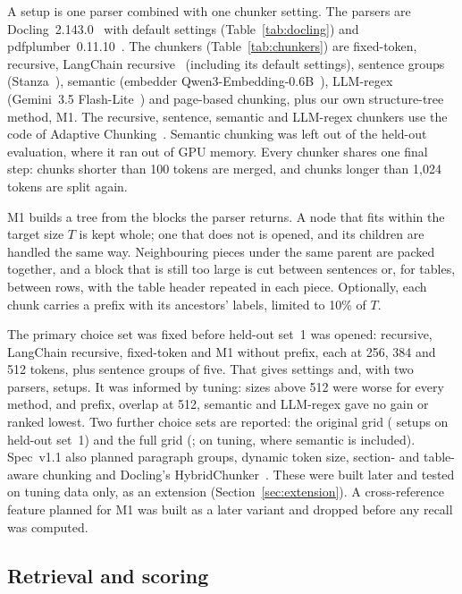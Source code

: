 A setup is one parser combined with one chunker setting. The parsers are
Docling~2.143.0~\cite{auer2024docling} with default settings (Table~\ref{tab:docling})
and pdfplumber~0.11.10~\cite{pdfplumber}. The chunkers (Table~\ref{tab:chunkers}) are
fixed-token, recursive, LangChain recursive~\cite{langchain} (including its default settings),
sentence groups (Stanza~\cite{stanza}), semantic (embedder Qwen3-Embedding-0.6B~\cite{qwen3embedding}), LLM-regex (Gemini~3.5 Flash-Lite~\cite{gemini}) and page-based
chunking, plus our own structure-tree method, M1. The recursive, sentence,
semantic and LLM-regex chunkers use the code of Adaptive
Chunking~\cite{demourajunior2026adaptive}. Semantic chunking was left out
of the held-out evaluation, where it ran out of GPU memory. Every chunker shares one final step: chunks shorter
than 100 tokens are merged, and chunks longer than 1,024 tokens are split
again.

M1 builds a tree from the blocks the parser returns. A node that fits within
the target size $T$ is kept whole; one that does not is opened, and its
children are handled the same way. Neighbouring pieces under the same parent
are packed together, and a block that is still too large is cut between
sentences or, for tables, between rows, with the table header repeated in
each piece. Optionally, each chunk carries a prefix with its ancestors'
labels, limited to 10\% of $T$.

The primary choice set was fixed before held-out set~1 was opened: recursive,
LangChain recursive, fixed-token and M1 without prefix, each at 256, 384 and
512 tokens, plus sentence groups of five. That gives \RQonePrimarySettings{} settings and, with two
parsers, \RQoneSetups{} setups. It was informed by tuning: sizes above 512 were
worse for every method, and prefix, overlap at 512, semantic and LLM-regex gave
no gain or ranked lowest. Two further choice sets are reported: the original
grid (\RQoneOriginalSetups{} setups on held-out set~1) and the full grid
(\HeldOutSetups{}; \TuningSetups{} on tuning, where semantic is included). Spec~v1.1 also planned paragraph groups, dynamic token
size, section- and table-aware chunking and Docling's HybridChunker~\cite{hybridchunker}. These were
built later and tested on tuning data only, as an extension
(Section~\ref{sec:extension}). A cross-reference feature planned for M1 was built as a later variant and dropped
before any recall was computed.

\subsection{Retrieval and scoring}\label{sec:scoring}

